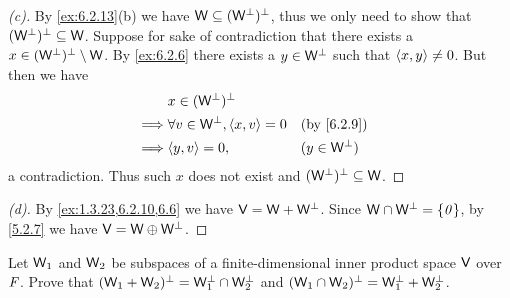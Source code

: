 \begin{proof}[(c)]
	By \cref{ex:6.2.13}(b) we have \(\mathsf{W} \subseteq (\mathsf{W}^{\perp})^{\perp}\), thus we only need to show that \((\mathsf{W}^{\perp})^{\perp} \subseteq \mathsf{W}\).
	Suppose for sake of contradiction that there exists a \(x \in (\mathsf{W}^{\perp})^{\perp} \setminus \mathsf{W}\).
	By \cref{ex:6.2.6} there exists a \(y \in \mathsf{W}^{\perp}\) such that \(\left\langle x, y\right\rangle \neq 0\).
	But then we have
	\begin{align*}
		         & x \in (\W^{\perp})^{\perp}                                       \\
		\implies & \forall v \in \W^{\perp}, \inn{x, v} = 0 &  & \by{6.2.9}         \\
		\implies & \inn{y, v} = 0,                          &  & (y \in \W^{\perp})
	\end{align*}
	a contradiction.
	Thus such \(x\) does not exist and \((\mathsf{W}^{\perp})^{\perp} \subseteq \mathsf{W}\).
\end{proof}

\begin{proof}[(d)]
	By \cref{ex:1.3.23,6.2.10,6.6} we have \(\mathsf{V} = \mathsf{W} + \mathsf{W}^{\perp}\).
	Since \(\mathsf{W} \cap \mathsf{W}^{\perp} = \left\lbrace\mathit{0}\right\rbrace\), by \cref{5.2.7} we have \(\mathsf{V} = \mathsf{W} \oplus \mathsf{W}^{\perp}\).
\end{proof}

\begin{ex}\label{ex:6.2.14}
	Let \(\mathsf{W}_1\) and \(\mathsf{W}_2\) be subspaces of a finite-dimensional inner product space \(\mathsf{V}\) over \(\mathit{F}\).
	Prove that \((\mathsf{W}_1 + \mathsf{W}_2)^{\perp} = \mathsf{W}_1^{\perp} \cap \mathsf{W}_2^{\perp}\) and \((\mathsf{W}_1 \cap \mathsf{W}_2)^{\perp} = \mathsf{W}_1^{\perp} + \mathsf{W}_2^{\perp}\).
\end{ex}


